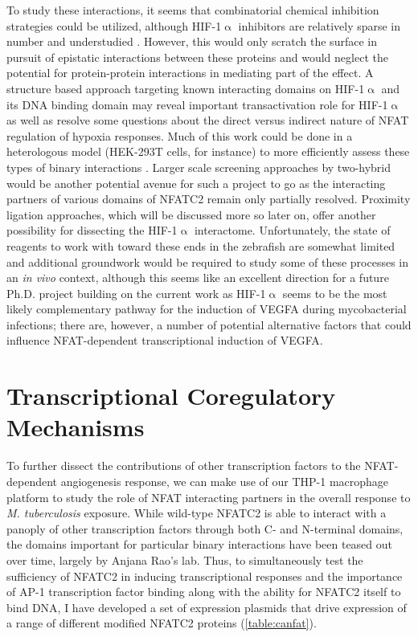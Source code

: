 To study these interactions, it seems that combinatorial chemical inhibition strategies could be utilized, although HIF\hyp{}1$\upalpha$ inhibitors are relatively sparse in number and understudied \citep{Viziteu2016}. However, this would only scratch the surface in pursuit of epistatic interactions between these proteins and would neglect the potential for protein\hyp{}protein interactions in mediating part of the effect. A structure based approach targeting known interacting domains on HIF\hyp{}1$\upalpha$ and its DNA binding domain may reveal important transactivation role for HIF\hyp{}1$\upalpha$ as well as resolve some questions about the direct versus indirect nature of NFAT regulation of hypoxia responses. Much of this work could be done in a heterologous model (HEK\hyp{}293T cells, for instance) to more efficiently assess these types of binary interactions \citep{Graham1977}. Larger scale screening approaches by two\hyp{}hybrid would be another potential avenue for such a project to go as the interacting partners of various domains of NFATC2 remain only partially resolved. Proximity ligation approaches, which will be discussed more so later on, offer another possibility for dissecting the HIF\hyp{}1$\upalpha$ interactome. Unfortunately, the state of reagents to work with toward these ends in the zebrafish are somewhat limited and additional groundwork would be required to study some of these processes in an \textit{in vivo} context, although this seems like an excellent direction for a future Ph.D. project building on the current work as HIF-1$\upalpha$ seems to be the most likely complementary pathway for the induction of VEGFA during mycobacterial infections; there are, however, a number of potential alternative factors that could influence NFAT-dependent transcriptional induction of VEGFA.

\section{Transcriptional Coregulatory Mechanisms}\label{nfatpartners}

To further dissect the contributions of other transcription factors to the NFAT\hyp{}dependent angiogenesis response, we can make use of our THP\hyp{}1 macrophage platform to study the role of NFAT interacting partners in the overall response to \textit{M. tuberculosis} exposure. While wild\hyp{}type NFATC2 is able to interact with a panoply of other transcription factors through both C\hyp{} and N\hyp{}terminal domains, the domains important for particular binary interactions have been teased out over time, largely by Anjana Rao's lab. Thus, to simultaneously test the sufficiency of NFATC2 in inducing transcriptional responses and the importance of AP\hyp{}1 transcription factor binding along with the ability for NFATC2 itself to bind DNA, I have developed a set of expression plasmids that drive expression of a range of different modified NFATC2 proteins (\autoref{table:canfat}).

